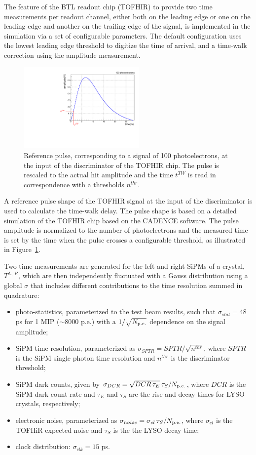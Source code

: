The feature of the BTL readout chip (TOFHIR) to provide two time measurements per 
readout channel, either both on the leading edge or one on the leading edge and 
another on the trailing edge of the signal, is implemented in the simulation via 
a set of configurable parameters. The default configuration uses the lowest leading 
edge threshold to digitize the time of arrival, and a time-walk correction using 
the amplitude measurement. 
% 
\begin{figure}[tp]
\centering
\includegraphics[width=0.55\textwidth]{fig/performance/btl_pulse.pdf}
\caption{Reference pulse, corresponding to a signal of 100 photoelectrons, at the 
input of the discriminator of the TOFHIR chip. The pulse is rescaled to the actual 
hit amplitude and the time $t^{TW}$ is read in correspondence with a thresholds $n^{thr}$.
\label{fig:BTL_pulse}}
\end{figure}
A reference pulse shape of the TOFHIR signal at the input of the discriminator is 
used to calculate the time-walk delay. The pulse shape is based on a detailed
simulation of the TOFHIR chip based on the CADENCE software. The pulse amplitude 
is normalized to the number of photoelectrons and the measured time is set by the 
time when the pulse crosses a configurable threshold, as illustrated in
Figure~\ref{fig:BTL_pulse}.

Two time measurements are generated for the left and right SiPMs of a crystal, 
$T^{L,\,R}$, which are then independently fluctuated with a Gauss distribution 
using a global $\sigma$ that includes different contributions to the time 
resolution summed in quadrature:
\begin{itemize}
\item photo-statistics, parameterized to the test beam results, such that $\sigma_{stat} = 48$ ps for 1 MIP 
      ($\sim$8000 p.e.) with a $1/\sqrt{N_{\rm p.e.}}$ dependence on the signal amplitude;
\item SiPM time resolution, parameterized as $\sigma_{SPTR} = SPTR/\sqrt{n^{thr}}$, 
      where $SPTR$ is the SiPM single photon time resolution and $n^{thr}$ is the discriminator threshold;
\item SiPM dark counts, given by $\sigma_{DCR} = \sqrt{DCR\, \tau_{E}}\:\tau_S/N_{\rm p.e.}$, where $DCR$ is the
      SiPM dark count rate and $\tau_E$ and $\tau_S$ are the rise and decay times for LYSO crystals, respectively;
\item electronic noise, parameterized as $\sigma_{noise} = \sigma_{el}\,\tau_S/N_{\rm p.e.}$, where $\sigma_{el}$
      is the TOFHiR expected noise and $\tau_S$ is the the LYSO decay time;
\item clock distribution: $\sigma_{clk} = 15$ ps.
\end{itemize}

